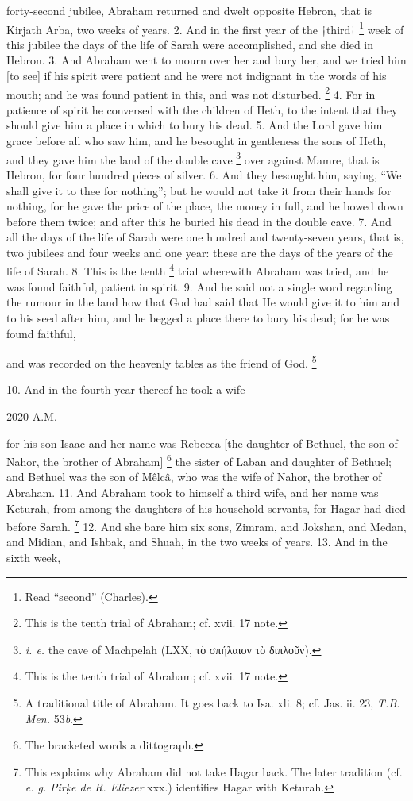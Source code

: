 forty-second jubilee, Abraham returned and dwelt opposite Hebron, that is Kirjath Arba, two weeks of years. 2. And in the first year of the †third† \footnote{Read ``second'' (Charles).} week of this jubilee the days of the life of Sarah were accomplished, and she died in Hebron. 3. And Abraham went to mourn over her and bury her, and we tried him [to see] if his spirit were patient and he were not indignant in the words of his mouth; and he was found patient in this, and was not disturbed. \footnote{This is the tenth trial of Abraham; cf. xvii. 17 note.} 4. For in patience of spirit he conversed with the children of Heth, to the intent that they should give him a place in which to bury his dead. 5. And the Lord gave him grace before all who saw him, and he besought in gentleness the sons of Heth, and they gave him the land of the double cave \footnote{\emph{i. e.} the cave of Machpelah (LXX, \textgreek{τὸ σπήλαιον τὸ διπλοῦν}).} over against Mamre, that is Hebron, for four hundred pieces of silver. 6. And they besought him, saying, ``We shall give it to thee for nothing''; but he would not take it from their hands for nothing, for he gave the price of the place, the money in full, and he bowed down before them twice; and after this he buried his dead in the double cave. 7. And all the days of the life of Sarah were one hundred and twenty-seven years, that is, two jubilees and four weeks and one year: these are the days of the years of the life of Sarah. 8. This is the tenth \footnote{This is the tenth trial of Abraham; cf. xvii. 17 note.} trial wherewith Abraham was tried, and he was found faithful, patient in spirit. 9. And he said not a single word regarding the rumour in the land how that God had said that He would give it to him and to his seed after him, and he begged a place there to bury his dead; for he was found faithful,

and was recorded on the heavenly tables as the friend of God. \footnote{A traditional title of Abraham. It goes back to Isa. xli. 8; cf. Jas. ii. 23, \emph{T.B. Men.} 53\emph{b}.}


10. And in the fourth year thereof he took a wife

2020 A.M.

for his son Isaac and her name was Rebecca [the daughter of Bethuel, the son of Nahor, the brother of Abraham] \footnote{The bracketed words a dittograph.} the sister of Laban and daughter of Bethuel; and Bethuel was the son of Mêlcâ, who was the wife of Nahor, the brother of Abraham. 11. And Abraham took to himself a third wife, and her name was Keturah, from among the daughters of his household servants, for Hagar had died before Sarah. \footnote{This explains why Abraham did not take Hagar back. The later tradition (cf. \emph{e. g.} \emph{Pir\d{k}e de R. Eliezer} xxx.) identifies Hagar with Keturah.} 12. And she bare him six sons, Zimram, and Jokshan, and Medan, and Midian, and Ishbak, and Shuah, in the two weeks of years. 13. And in the sixth week,

